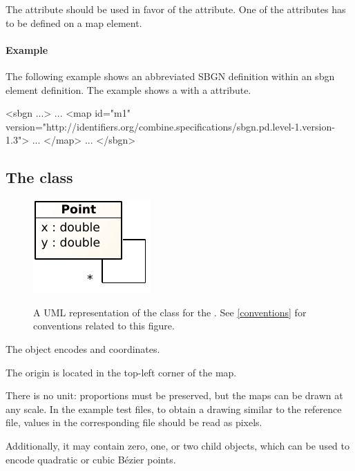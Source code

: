The  attribute should be used in favor of the  attribute. One of the attributes has to be defined on a map element.

\paragraph{Example}

The following example shows an abbreviated SBGN \Map definition within an sbgn element definition. The example shows a \Map with a  attribute.

\begin{example}
<sbgn ...>
    ...
    <map id="m1" version="http://identifiers.org/combine.specifications/sbgn.pd.level-1.version-1.3">
        ...
    </map>
    ...
</sbgn>
\end{example}


\subsection{The  class}
\label{point-class}

\begin{figure}[ht!]
  \centering
  \includegraphics[scale=1.0]{figures/sbgnml_point_uml.pdf}\\
\caption{A UML representation of the \Point class for the
\SbgnmlPackage. See \ref{conventions} for conventions related to this
figure. }
  \label{fig:sbgnml_point_uml}
\end{figure}


The \Point object encodes  and  coordinates. 

The origin is located in the top-left corner of the map.

There is no unit: proportions must be preserved, but the maps can be drawn at any scale. In the example test files, to obtain a drawing similar to the reference \value{*.png} file, values in the corresponding \value{*.sbgn} file should be read as pixels.

Additionally, it may contain zero, one, or two child \Point objects, which can be used to encode quadratic or cubic B\'{e}zier points. 

